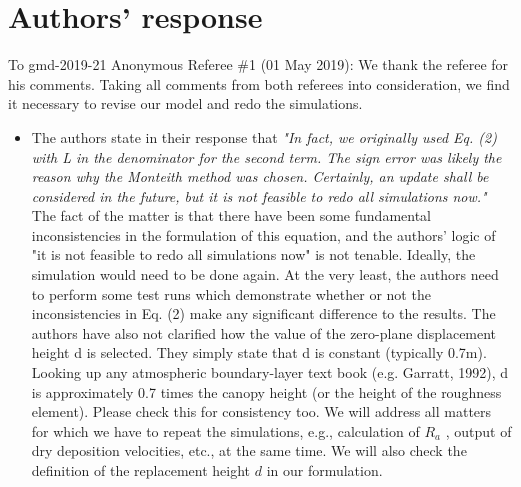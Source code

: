 \section*{Authors' response}
To gmd-2019-21 Anonymous Referee \#1 (01 May 2019):
We thank the referee for his comments. Taking all comments from both referees
into consideration, we find it necessary to revise our model and redo the simulations.
\begin{itemize}
\item {\color{blue}  The authors state in their response that \emph{"In fact, we originally used Eq. (2) with L in
the denominator for the second term. The sign error was likely the reason why the
Monteith method was chosen. Certainly, an update shall be considered in the future,
but it is not feasible to redo all simulations now."}
The fact of the matter is that there have been some fundamental inconsistencies in
the formulation of this equation, and the authors’ logic of "it is not feasible to redo all
simulations now" is not tenable. Ideally, the simulation would need to be done again. At
the very least, the authors need to perform some test runs which demonstrate whether
or not the inconsistencies in Eq. (2) make any significant difference to the results.
The authors have also not clarified how the value of the zero-plane displacement height
d is selected. They simply state that d is constant (typically 0.7m). Looking up any
atmospheric boundary-layer text book (e.g. Garratt, 1992), d is approximately 0.7 times
the canopy height (or the height of the roughness element). Please check this for
consistency too.}
  We will address all matters for which we have to repeat the simulations, e.g.,
  calculation of $R_a$ , output of dry deposition velocities, etc., at the same time. We will
  also check the definition of the replacement height $d$ in our formulation. 
\end{itemize}
